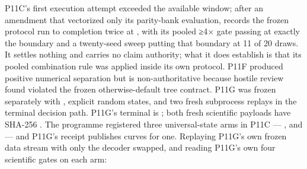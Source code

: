 {}P11C's first execution attempt exceeded the available window; after an amendment that vectorized only its parity-bank evaluation,  records the frozen protocol run to completion twice at , with its pooled ≥4× gate passing at exactly the boundary and a twenty-seed sweep putting that boundary at 11 of 20 draws. It settles nothing and carries no claim authority; what it does establish is that its pooled combination rule was applied inside its own protocol. P11F produced positive numerical separation but is non-authoritative because hostile review found  violated the frozen otherwise-default tree contract. P11G was frozen separately with , explicit random states, and two fresh subprocess replays in the terminal decision path.\markdownRendererInterblockSeparator
{}\markdownRendererInterblockSeparator
{}P11G's terminal is ; both fresh scientific payloads have SHA-256 .\markdownRendererInterblockSeparator
{}
\markdownRendererSectionEnd \markdownRendererSectionBegin
{}\markdownRendererInterblockSeparator
{}The programme registered three universal-state arms in P11C — ,  and  — and P11G's receipt publishes curves for one. Replaying P11G's own frozen data stream with only the decoder swapped, and reading P11G's own four scientific gates on each arm:\markdownRendererInterblockSeparator
